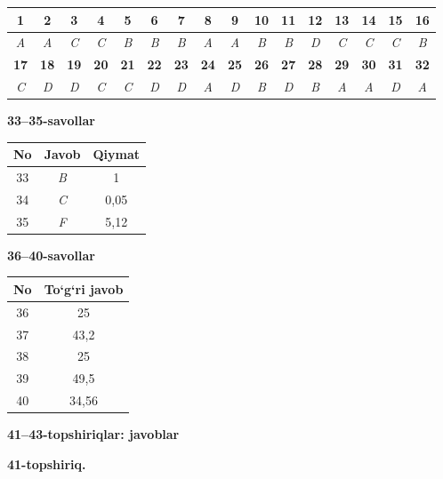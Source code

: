\documentclass[11pt,a4paper]{article}
\begin{document}
\noindent\begin{tabular}{|c|c|c|c|c|c|c|c|c|c|c|c|c|c|c|c|}\hline
\textbf{1} & \textbf{2} & \textbf{3} & \textbf{4} & \textbf{5} & \textbf{6} & \textbf{7} & \textbf{8} & \textbf{9} & \textbf{10} & \textbf{11} & \textbf{12} & \textbf{13} & \textbf{14} & \textbf{15} & \textbf{16}\\\hline
\textsl{A} & \textsl{A} & \textsl{C} & \textsl{C} & \textsl{B} & \textsl{B} & \textsl{B} & \textsl{A} & \textsl{A} & \textsl{B} & \textsl{B} & \textsl{D} & \textsl{C} & \textsl{C} & \textsl{C} & \textsl{B}\\\hline
\textbf{17} & \textbf{18} & \textbf{19} & \textbf{20} & \textbf{21} & \textbf{22} & \textbf{23} & \textbf{24} & \textbf{25} & \textbf{26} & \textbf{27} & \textbf{28} & \textbf{29} & \textbf{30} & \textbf{31} & \textbf{32}\\\hline
\textsl{C} & \textsl{D} & \textsl{D} & \textsl{C} & \textsl{C} & \textsl{D} & \textsl{D} & \textsl{A} & \textsl{D} & \textsl{B} & \textsl{D} & \textsl{B} & \textsl{A} & \textsl{A} & \textsl{D} & \textsl{A}\\\hline
\end{tabular}\par\medskip
\noindent\textbf{33--35-savollar}\par\smallskip
\noindent\begin{tabular}{|c|c|c|}\hline \textbf{No} & \textbf{Javob} & \textbf{Qiymat}\\\hline
33 & \textsl{B} & 1\\\hline
34 & \textsl{C} & 0,05\\\hline
35 & \textsl{F} & 5,12\\\hline
\end{tabular}\par\medskip
\noindent\textbf{36--40-savollar}\par\smallskip
\noindent\begin{tabular}{|c|c|}\hline \textbf{No} & \textbf{To`g`ri javob}\\\hline
36 & 25\\\hline
37 & 43,2\\\hline
38 & 25\\\hline
39 & 49,5\\\hline
40 & 34,56\\\hline
\end{tabular}\par\medskip
\noindent\textbf{41--43-topshiriqlar: javoblar}\par\smallskip
\noindent\textbf{41-topshiriq.}\par
\end{document}
